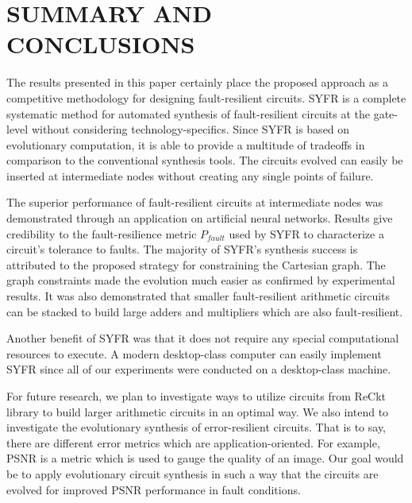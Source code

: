 \newpage
\section{SUMMARY AND CONCLUSIONS}




The results presented in this paper certainly place the proposed approach as a competitive methodology for designing fault-resilient circuits. SYFR is a complete systematic method for automated synthesis of fault-resilient circuits at the gate-level without considering technology-specifics. Since SYFR is based on evolutionary computation, it is able to provide a multitude of tradeoffs in comparison to the conventional synthesis tools. The circuits evolved can easily be inserted at intermediate nodes without creating any single points of failure.

The superior performance of fault-resilient circuits at intermediate nodes was demonstrated through an application on artificial neural networks. Results give credibility to the fault-resilience metric $P_{fault}$ used by SYFR to characterize a circuit's tolerance to faults. The majority of SYFR's synthesis success is attributed to the proposed strategy for constraining the Cartesian graph. The graph constraints made the evolution much easier as confirmed by experimental results. It was also demonstrated that smaller fault-resilient arithmetic circuits can be stacked to build large adders and multipliers which are also fault-resilient. 

Another benefit of SYFR was that it does not require any special computational resources to execute. A modern desktop-class computer can easily implement SYFR since all of our experiments were conducted on a desktop-class machine. 

For future research, we plan to investigate ways to utilize circuits from ReCkt library to build larger arithmetic circuits in an optimal way. We also intend to investigate the evolutionary synthesis of error-resilient circuits. That is to say, there are different error metrics which are application-oriented. For example, PSNR is a metric which is used to gauge the quality of an image. Our goal would be to apply evolutionary circuit synthesis in such a way that the circuits are evolved for improved PSNR performance in fault conditions.

